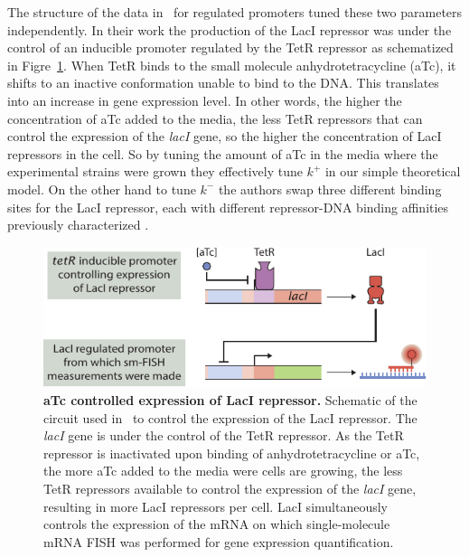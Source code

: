 The structure of the data in~\cite{Jones2014} for regulated promoters tuned
these two parameters independently. In their work the production of the LacI
repressor was under the control of an inducible promoter regulated by the TetR
repressor as schematized in Figre~\ref{figS:aTc_circuit}. When TetR binds to the
small molecule anhydrotetracycline (aTc), it shifts to an inactive conformation
unable to bind to the DNA. This translates into an increase in gene expression
level. In other words, the higher the concentration of aTc added to the media,
the less TetR repressors that can control the expression of the \textit{lacI}
gene, so the higher the concentration of LacI repressors in the cell. So by 
tuning the amount of aTc in the media where the experimental strains were grown
they effectively tune $k^+$ in our simple theoretical model. On the other hand
to tune $k^-$ the authors swap three different binding sites for the LacI 
repressor, each with different repressor-DNA binding affinities previously 
characterized \cite{Garcia2011a}.

\begin{figure}[h!]
\centering
\includegraphics{../../figures/si/figS0X_aTc_circuit.pdf}
\caption{\textbf{aTc controlled expression of LacI repressor.} Schematic of the
circuit used in~\cite{Jones2014} to control the expression of the LacI
repressor. The \textit{lacI} gene is under the control of the TetR repressor. As
the TetR repressor is inactivated upon binding of anhydrotetracycline or aTc,
the more aTc added to the media were cells are growing, the less TetR repressors
available to control the expression of the \textit{lacI} gene, resulting in more
LacI repressors per cell. LacI simultaneously controls the expression of the
mRNA on which single-molecule mRNA FISH was performed for gene expression
quantification.}
\label{figS:aTc_circuit}
\end{figure}

